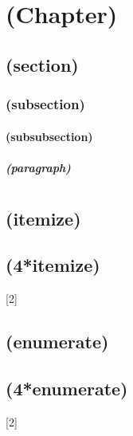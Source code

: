 
\makeatletter
\chapter{ (Chapter)}
\Blindtext
\section{ (section)}
\Blindtext
\subsection{ (subsection)}
\Blindtext
\subsubsection{ (subsubsection)}
\Blindtext
\paragraph{ (paragraph)}
\Blindtext
\chapter{\blindtext@list}%
\section{\blindtext@listEx (itemize)}%
\Blinditemize[3]
\section{\blindtext@listEx (4*itemize)}%
{}[2]%
\section{\blindtext@listEx (enumerate)}%
\Blindenumerate[3]
\section{\blindtext@listEx (4*enumerate)}%
{}[2]%
\makeatother



